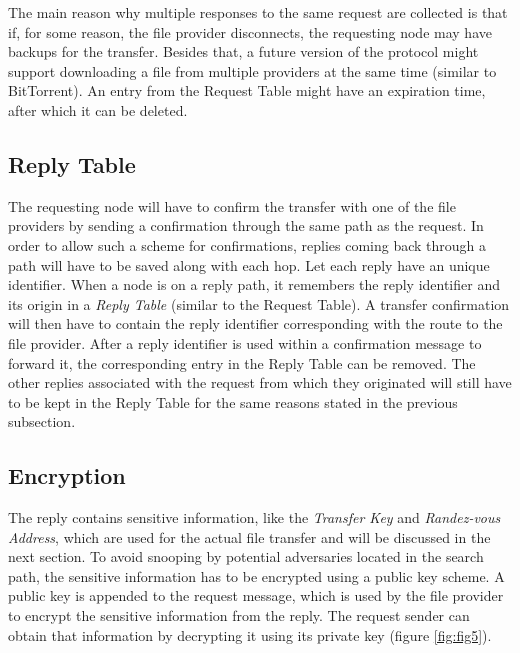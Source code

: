 The main reason why multiple responses to the same request are collected is 
that if, for some reason, the file provider disconnects, the requesting node 
may have backups for the transfer. Besides that, a future version of the 
protocol might support downloading a file from multiple providers at the same 
time (similar to BitTorrent). An entry from the Request Table might have an 
expiration time, after which it can be deleted.

\subsection{Reply Table}

The requesting node will have to confirm the transfer with one of the file 
providers by sending a confirmation through the same path as the request. In 
order to allow such a scheme for confirmations, replies coming back through a 
path will have to be saved along with each hop. Let each reply have an unique 
identifier. When a node is on a reply path, it remembers the reply identifier 
and its origin in a \textit{Reply Table} (similar to the Request Table). A 
transfer confirmation will then have to contain the reply identifier 
corresponding with the route to the file provider. After a reply identifier is 
used within a confirmation message to forward it, the corresponding entry in 
the Reply Table can be removed. The other replies associated with the request 
from which they originated will still have to be kept in the Reply Table for 
the same reasons stated in the previous subsection.

\subsection{Encryption}

The reply contains sensitive information, like the \textit{Transfer Key} and 
\textit{Randez-vous Address}, which are used for the actual file transfer and 
will be discussed in the next section. To avoid snooping by potential 
adversaries located in the search path, the sensitive information has to be 
encrypted using a public key scheme. A public key is appended to the request 
message, which is used by the file provider to encrypt the sensitive 
information from the reply. The request sender can obtain that information by 
decrypting it using its private key (figure \ref{fig:fig5}).

